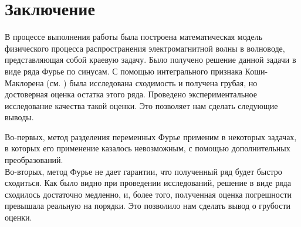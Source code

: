 \chapter*{Заключение}

В процессе выполнения работы была построена математическая модель физического процесса
распространения электромагнитной волны в волноводе, представляющая собой краевую задачу.
Было получено решение данной задачи в виде ряда Фурье по синусам. С помощью интегрального признака
Коши-Маклорена (см. \cite{sendov}) была исследована сходимость и получена грубая, но 
достоверная оценка остатка этого ряда. Проведено экспериментальное исследование качества такой оценки.
Это позволяет нам сделать следующие выводы.

Во-первых, метод разделения переменных Фурье применим в некоторых задачах, в которых его применение казалось
невозможным, с помощью дополнительных преобразований.\\
Во-вторых, метод Фурье не дает гарантии, что полученный ряд будет быстро сходиться. Как было видно при проведении
исследований, решение в виде ряда сходилось достаточно медленно, и, более того, полученная оценка погрешности
превышала реальную на порядки. Это позволило нам сделать вывод о грубости оценки.


